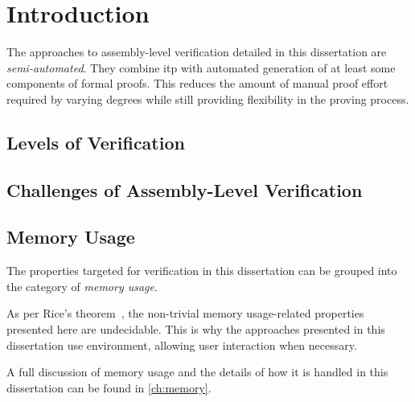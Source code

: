 \chapter{Introduction}
The approaches to assembly-level verification detailed in this dissertation%
are \emph{semi-automated}.
They combine \ac{itp} with automated generation
of at least some components of formal proofs.
This reduces the amount of manual proof effort required by varying degrees
while still providing flexibility in the proving process.


\section{Levels of Verification}  
\section{Challenges of Assembly-Level Verification}
\section{Memory Usage}
The properties targeted for verification in this dissertation
can be grouped into the category of \emph{memory usage}.%


As per Rice's theorem~\citep{rice1953classes},
the non-trivial memory usage-related properties presented here are undecidable.%
This is why the approaches presented in this dissertation
use  environment, allowing user interaction when necessary.

A full discussion of memory usage
and the details of how it is handled in this dissertation
can be found in \cref{ch:memory}.
